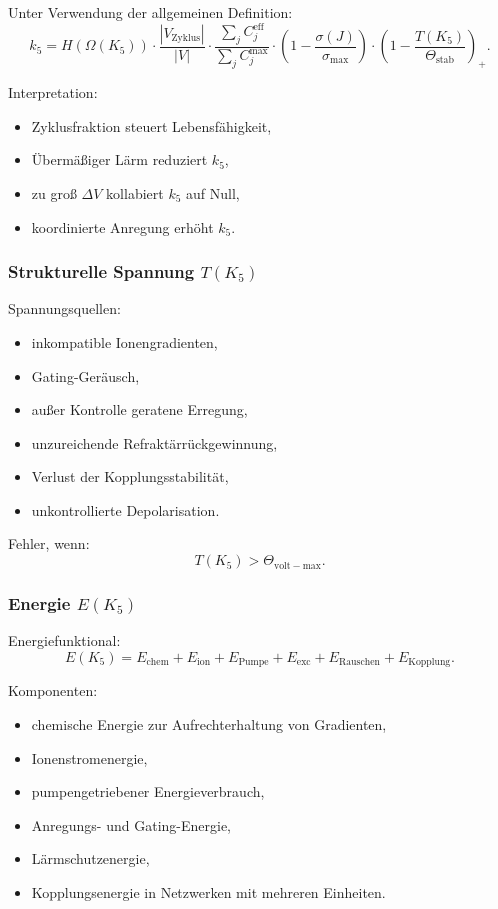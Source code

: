 Unter Verwendung der allgemeinen Definition:
\[
k_5
= H(\Omega(K_5))
  \cdot\frac{|V_{\mathrm{Zyklus}}|}{|V|}
  \cdot\frac{\sum_j C_j^{\mathrm{eff}}}{\sum_j C_j^{\max}}
  \cdot\left(1-\frac{\sigma(J)}{\sigma_{\max}}\right)
  \cdot\left(1-\frac{T(K_5)}{\Theta_{\mathrm{stab}}}\right)_+.
\]

Interpretation:
\begin{itemize}
    \item Zyklusfraktion steuert Lebensfähigkeit,
    \item Übermäßiger Lärm reduziert $k_5$,
    \item zu groß $\Delta V$ kollabiert $k_5$ auf Null,
    \item koordinierte Anregung erhöht $k_5$.
\end{itemize}

\subsubsection{Strukturelle Spannung \texorpdfstring{$T(K_5)$}{T(K_5)}}

Spannungsquellen:
\begin{itemize}
    \item inkompatible Ionengradienten,
    \item Gating-Geräusch,
    \item außer Kontrolle geratene Erregung,
    \item unzureichende Refraktärrückgewinnung,
    \item Verlust der Kopplungsstabilität,
    \item unkontrollierte Depolarisation.
\end{itemize}

Fehler, wenn:
\[
T(K_5) > \Theta_{\mathrm{volt-max}}.
\]

\subsubsection{Energie \texorpdfstring{$E(K_5)$}{E(K_5)}}

Energiefunktional:
\[
E(K_5)
= E_{\mathrm{chem}}
+ E_{\mathrm{ion}}
+ E_{\mathrm{Pumpe}}
+ E_{\mathrm{exc}}
+ E_{\mathrm{Rauschen}}
+ E_{\mathrm{Kopplung}}.
\]

Komponenten:
\begin{itemize}
    \item chemische Energie zur Aufrechterhaltung von Gradienten,
    \item Ionenstromenergie,
    \item pumpengetriebener Energieverbrauch,
    \item Anregungs- und Gating-Energie,
    \item Lärmschutzenergie,
    \item Kopplungsenergie in Netzwerken mit mehreren Einheiten.
\end{itemize}


